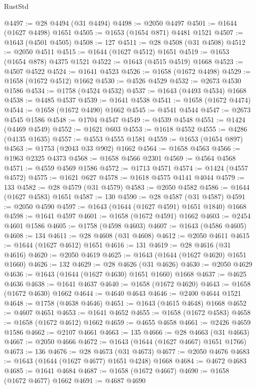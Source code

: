 \begin{lexlean}{RustStd}
\begin{coremodule}
@4497 := @28 @4494 (@31 @4494)
@4498 := @2050 @4497
@4501 := @1644 (@1627 @4498) @1651
@4505 := @1653 (@1654 @871) @4481 @1521
@4507 := @1643 (@4501 @4505)
@4508 := 127
@4511 := @28 @4508 (@31 @4508)
@4512 := @2050 @4511
@4515 := @1644 (@1627 @4512) @1651
@4519 := @1653 (@1654 @878) @4375 @1521
@4522 := @1643 (@4515 @4519) @1668
@4523 := @4507 @4522
@4524 := @1641 @4523
@4526 := @1658 (@1672 @4498)
@4529 := @1658 (@1672 @4512) @1662
@4530 := @4526 @4529
@4532 := @2673 @4530 @1586
@4534 := @1758 (@4524 @4532)
@4537 := @1643 (@4493 @4534) @1668
@4538 := @4485 @4537
@4539 := @1641 @4538
@4541 := @1658 (@1672 @4474)
@4544 := @1658 (@1672 @4490) @1662
@4545 := @4541 @4544
@4547 := @2673 @4545 @1586
@4548 := @1704 @4547
@4549 := @4539 @4548
@4551 := @1424 (@4469 @4549)
@4552 := @1621 @603
@4553 := @1618 @4552
@4555 := @4286 (@4135 @1635)
@4557 := @4553 @4555 @1581
@4559 := @1653 (@1654 @897)
@4563 := @1753 (@2043 @33 @902) @1662
@4564 := @1658 @4563
@4566 := @1963 @2325 @4373
@4568 := @1658 @4566 @2301
@4569 := @4564 @4568
@4571 := @4559 @4569 @1586
@4572 := @1713 @4571
@4574 := @1424 (@4557 @4572)
@4575 := @1621 @627
@4578 := @1618 @4575 @4141 @4044
@4579 := 133
@4582 := @28 @4579 (@31 @4579)
@4583 := @2050 @4582
@4586 := @1644 (@1627 @4583) @1651
@4587 := 130
@4590 := @28 @4587 (@31 @4587)
@4591 := @2050 @4590
@4597 := @1643 (@1644 (@1627 @4591) @1651 @1840) @1668
@4598 := @1641 @4597
@4601 := @1658 (@1672 @4591) @1662
@4603 := @2454 @4601 @1586
@4605 := @1758 (@4598 @4603)
@4607 := @1643 (@4586 @4605)
@4608 := 134
@4611 := @28 @4608 (@31 @4608)
@4612 := @2050 @4611
@4615 := @1644 (@1627 @4612) @1651
@4616 := 131
@4619 := @28 @4616 (@31 @4616)
@4620 := @2050 @4619
@4625 := @1643 (@1644 (@1627 @4620) @1651 @1660)
@4626 := 132
@4629 := @28 @4626 (@31 @4626)
@4630 := @2050 @4629
@4636 := @1643 (@1644 (@1627 @4630) @1651 @1660) @1668
@4637 := @4625 @4636
@4638 := @1641 @4637
@4640 := @1658 (@1672 @4620)
@4643 := @1658 (@1672 @4630) @1662
@4644 := @4640 @4643
@4646 := @2400 @4644 @1521
@4648 := @1758 (@4638 @4646)
@4651 := @1643 (@4615 @4648) @1668
@4652 := @4607 @4651
@4653 := @1641 @4652
@4655 := @1658 (@1672 @4583)
@4658 := @1658 (@1672 @4612) @1662
@4659 := @4655 @4658
@4661 := @2426 @4659 @1586
@4662 := @2107 @4661
@4663 := 135
@4666 := @28 @4663 (@31 @4663)
@4667 := @2050 @4666
@4672 := @1643 (@1644 (@1627 @4667) @1651 @1766)
@4673 := 136
@4676 := @28 @4673 (@31 @4673)
@4677 := @2050 @4676
@4683 := @1643 (@1644 (@1627 @4677) @1651 @4248) @1668
@4684 := @4672 @4683
@4685 := @1641 @4684
@4687 := @1658 (@1672 @4667)
@4690 := @1658 (@1672 @4677) @1662
@4691 := @4687 @4690

\end{coremodule}
\end{lexlean}
